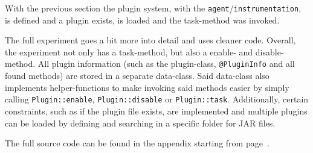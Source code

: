 With the previous section the plugin system, with the \texttt{agent}/\lstinline{instrumentation}, is defined and a plugin exists, is loaded and the task-method was invoked.

The full experiment goes a bit more into detail and uses cleaner code.
Overall, the experiment not only has a task-method, but also a enable- and disable-method.
All plugin information (such as the plugin-class, \lstinline{@PluginInfo} and all found methods) are stored in a separate data-class.
Said data-class also implements helper-functions to make invoking said methods easier by simply calling \lstinline{Plugin::enable}, \lstinline{Plugin::disable} or \lstinline{Plugin::task}.
Additionally, certain constraints, such as if the plugin file exists, are implemented and multiple plugins can be loaded by defining and searching in a specific folder for JAR files.

The full source code can be found in the appendix starting from page~\pageref{subsec:Experiment Source Code}.

\clearpage
